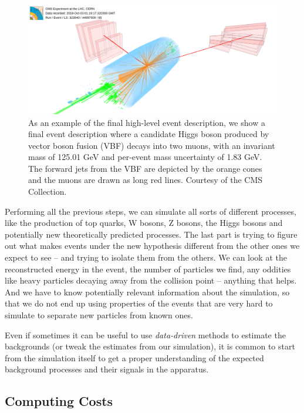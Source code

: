 \begin{figure}
    \centering
     \includegraphics[width=\columnwidth]{gfx/ch2/HIG-19-006_VBF_white.png}
    \caption[CMS Event]{As an example of the final high-level event description, we show a final event description  where a candidate Higgs boson produced by vector boson fusion (VBF) decays into two muons, with an invariant mass of 125.01 GeV and per-event mass uncertainty of 1.83 GeV. The forward jets from the VBF are depicted by the orange cones and the muons are drawn as long red lines. Courtesy of the CMS Collection.}
    \label{fig:cmsev}
\end{figure}


Performing all the previous steps, we can simulate all sorts of different processes, like the production of top quarks, W bosons, Z bosons, the Higgs bosons and potentially new theoretically predicted processes. The last part is trying to figure out what makes events under the new hypothesis different from the other ones we expect to see – and trying to isolate them from the others. We can look at the reconstructed energy in the event, the number of particles we find, any oddities like heavy particles decaying away from the collision point – anything that helps. And we have to know potentially relevant information about the simulation, so that we do not end up using properties of the events that are very hard to simulate to separate new particles from known ones. 

Even if sometimes it can be useful to use \emph{data-driven} methods to estimate the backgrounds (or tweak the estimates from our simulation), it is common to start from the simulation itself to get a proper understanding of the expected background processes and their signals in the apparatus.

\subsection{Computing Costs}

